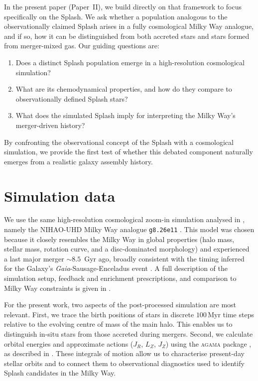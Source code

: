 \documentclass[fleqn,usenatbib]{mnras}
\begin{document}
In the present paper (Paper~II), we build directly on that framework to focus specifically on the Splash. We ask whether a population analogous to the observationally claimed Splash arises in a fully cosmological Milky Way analogue, and if so, how it can be distinguished from both accreted stars and stars formed from merger-mixed gas. 
Our guiding questions are:
\begin{enumerate}[leftmargin=2em,labelwidth=0em]
    \item Does a distinct Splash population emerge in a high-resolution cosmological simulation?
    \item What are its chemodynamical properties, and how do they compare to observationally defined Splash stars?
    \item What does the simulated Splash imply for interpreting the Milky Way’s merger-driven history?
\end{enumerate}

By confronting the observational concept of the Splash with a cosmological simulation, we provide the first test of whether this debated component naturally emerges from a realistic galaxy assembly history.

\section{Simulation data}
\label{sec:data}

We use the same high-resolution cosmological zoom-in simulation analysed in , namely the NIHAO-UHD Milky Way analogue \texttt{g8.26e11} \citep{Wang2015, Buck2020b, Buck2021}. This model was chosen because it closely resembles the Milky Way in global properties (halo mass, stellar mass, rotation curve, and a disc-dominated morphology) and experienced a last major merger $\sim 8.5$~Gyr ago, broadly consistent with the timing inferred for the Galaxy’s \textit{Gaia}-Sausage-Enceladus event \citep{Helmi2018, Naidu2020}. A full description of the simulation setup, feedback and enrichment prescriptions, and comparison to Milky Way constraints is given in .

For the present work, two aspects of the post-processed simulation are most relevant.  
First, we trace the birth positions of stars in discrete $100\,\mathrm{Myr}$ time steps relative to the evolving centre of mass of the main halo. This enables us to distinguish in-situ stars from those accreted during mergers.  
Second, we calculate orbital energies and approximate actions ($J_R$, $L_Z$, $J_Z$) using the \textsc{agama} package \citep{Vasiliev2019b}, as described in . These integrals of motion allow us to characterise present-day stellar orbits and to connect them to observational diagnostics used to identify Splash candidates in the Milky Way.
\end{document}

